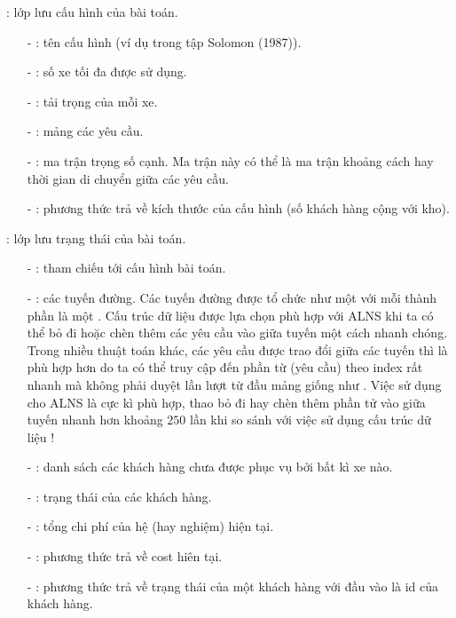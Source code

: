: lớp lưu cấu hình của bài toán.
\begin{itemize}
	\item[-] : tên cấu hình (ví dụ  trong tập Solomon (1987)).
	\item[-] : số xe tối đa được sử dụng.
	\item[-] : tải trọng của mỗi xe.
	\item[-] : mảng các yêu cầu.
	\item[-] : ma trận trọng số cạnh. Ma trận này có thể là ma trận khoảng cách hay thời gian di chuyển giữa các yêu cầu.
	\item[-] : phương thức trả về kích thước của cấu hình (số khách hàng cộng với kho).
\end{itemize}

: lớp lưu trạng thái của bài toán.
\begin{itemize}
	\item[-] : tham chiếu tới cấu hình bài toán.
	\item[-] : các tuyến đường. Các tuyến đường được tổ chức như một  với mỗi thành phần là một . Cấu trúc dữ liệu  được lựa chọn phù hợp với ALNS khi ta có thể  bỏ đi hoặc chèn thêm các yêu cầu vào giữa tuyến một cách nhanh chóng. Trong nhiều thuật toán khác, các yêu cầu được trao đổi giữa các tuyến thì  là phù hợp hơn do ta có thể truy cập đến phần từ (yêu cầu) theo index rất nhanh mà không phải duyệt lần lượt từ đầu mảng giống như . Việc sử dụng  cho ALNS là cực kì phù hợp, thao bỏ đi hay chèn thêm phần tử vào giữa tuyến nhanh hơn khoảng $250$ lần khi so sánh với việc sử dụng cấu trúc dữ liệu !
	\item[-] : danh sách các khách hàng chưa được phục vụ bởi bất kì xe nào.
	\item[-] : trạng thái của các khách hàng.
	\item[-] : tổng chi phí của hệ (hay nghiệm) hiện tại.
	\item[-] : phương thức trả về cost hiên tại.
	\item[-] : phương thức trả về trạng thái của một khách hàng với đầu vào là id của khách hàng.
\end{itemize}